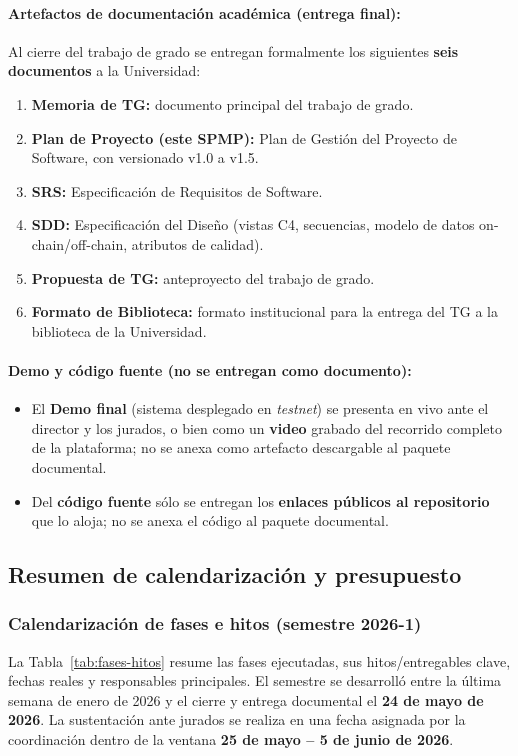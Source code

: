 \documentclass[12pt,oneside]{report}
\begin{document}
      \paragraph{Artefactos de documentación académica (entrega final):}
      Al cierre del trabajo de grado se entregan formalmente los siguientes \textbf{seis documentos} a la Universidad:
      \begin{enumerate}
        \item \textbf{Memoria de TG:} documento principal del trabajo de grado.
        \item \textbf{Plan de Proyecto (este SPMP):} Plan de Gestión del Proyecto de Software, con versionado v1.0 a v1.5.
        \item \textbf{SRS:} Especificación de Requisitos de Software.
        \item \textbf{SDD:} Especificación del Diseño (vistas C4, secuencias, modelo de datos on-chain/off-chain, atributos de calidad).
        \item \textbf{Propuesta de TG:} anteproyecto del trabajo de grado.
        \item \textbf{Formato de Biblioteca:} formato institucional para la entrega del TG a la biblioteca de la Universidad.
      \end{enumerate}

      \paragraph{Demo y código fuente (no se entregan como documento):}
      \begin{itemize}
        \item El \textbf{Demo final} (sistema desplegado en \textit{testnet}) se presenta en vivo ante el director y los jurados, o bien como un \textbf{video} grabado del recorrido completo de la plataforma; no se anexa como artefacto descargable al paquete documental.
        \item Del \textbf{código fuente} sólo se entregan los \textbf{enlaces públicos al repositorio} que lo aloja; no se anexa el código al paquete documental.
      \end{itemize}

    \subsection{Resumen de calendarización y presupuesto}
    \label{subsec:resumen-calendario-presupuesto}

      \subsubsection{Calendarización de fases e hitos (semestre 2026-1)}
      La Tabla~\ref{tab:fases-hitos} resume las fases ejecutadas, sus hitos/entregables clave, fechas reales y responsables principales. El semestre se desarrolló entre la última semana de enero de 2026 y el cierre y entrega documental el \textbf{24 de mayo de 2026}. La sustentación ante jurados se realiza en una fecha asignada por la coordinación dentro de la ventana \textbf{25 de mayo -- 5 de junio de 2026}.
\end{document}
